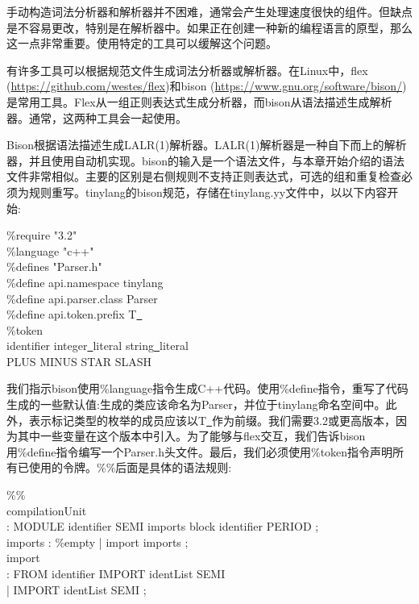 手动构造词法分析器和解析器并不困难，通常会产生处理速度很快的组件。但缺点是不容易更改，特别是在解析器中。如果正在创建一种新的编程语言的原型，那么这一点非常重要。使用特定的工具可以缓解这个问题。\par

有许多工具可以根据规范文件生成词法分析器或解析器。在Linux中，flex (\url{https://github.com/westes/flex})和bison (\url{https://www.gnu.org/software/bison/})是常用工具。Flex从一组正则表达式生成分析器，而bison从语法描述生成解析器。通常，这两种工具会一起使用。\par

Bison根据语法描述生成LALR(1)解析器。LALR(1)解析器是一种自下而上的解析器，并且使用自动机实现。bison的输入是一个语法文件，与本章开始介绍的语法文件非常相似。主要的区别是右侧规则不支持正则表达式，可选的组和重复检查必须为规则重写。tinylang的bison规范，存储在tinylang.yy文件中，以以下内容开始:\par

\begin{tcolorbox}[colback=white,colframe=black]
\%require "3.2" \\
\%language "c++" \\
\%defines "Parser.h" \\
\%define api.namespace {tinylang} \\
\%define api.parser.class {Parser} \\
\%define api.token.prefix {T\underline{~}} \\
\%token \\
identifier integer\underline{~}literal string\underline{~}literal \\
PLUS MINUS STAR SLASH
\end{tcolorbox}

我们指示bison使用\%language指令生成C++代码。使用\%define指令，重写了代码生成的一些默认值:生成的类应该命名为Parser，并位于tinylang命名空间中。此外，表示标记类型的枚举的成员应该以T\underline{~}作为前缀。我们需要3.2或更高版本，因为其中一些变量在这个版本中引入。为了能够与flex交互，我们告诉bison用\%define指令编写一个Parser.h头文件。最后，我们必须使用\%token指令声明所有已使用的令牌。\%\%后面是具体的语法规则:\par

\begin{tcolorbox}[colback=white,colframe=black]
\%\% \\
compilationUnit \\
\hspace*{0.5cm}: MODULE identifier SEMI imports block identifier PERIOD ; \\
imports : \%empty | import imports ; \\
import \\
\hspace*{0.5cm}: FROM identifier IMPORT identList SEMI \\
\hspace*{0.5cm}| IMPORT identList SEMI ;
\end{tcolorbox}

